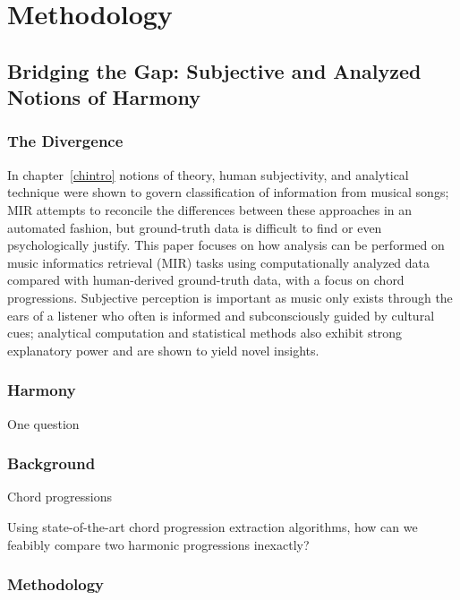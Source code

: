 \chapter{Methodology} \label{computationchordextract}

\section{Bridging the Gap: Subjective and Analyzed Notions of Harmony}

\subsection{The Divergence}

In chapter~\ref{chintro} notions of theory, human subjectivity, and analytical technique were shown to govern classification of information from musical songs; MIR attempts to reconcile the differences between these approaches in an automated fashion, but ground-truth data is difficult to find or even psychologically justify. This paper focuses on how analysis can be performed on music informatics retrieval (MIR) tasks using computationally analyzed data compared with human-derived ground-truth data, with a focus on chord progressions. Subjective perception is important as music only exists through the ears of a listener who often is informed and subconsciously guided by cultural cues; analytical computation and statistical methods also exhibit strong explanatory power and are shown to yield novel insights. 


\subsection{Harmony}

One question

\subsection{Background}

Chord progressions

\item Using state-of-the-art chord progression extraction algorithms, how can we feabibly compare two harmonic progressions inexactly?

\subsection{Methodology}


